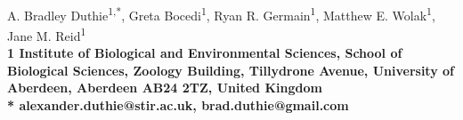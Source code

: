 \documentclass[10pt,letterpaper]{article}
\begin{document}
\vspace*{0.35in}

\begin{flushleft}
{\LARGE
\textbf{}
}
\newline
\\
A. Bradley Duthie\textsuperscript{1,*},
Greta Bocedi\textsuperscript{1},
Ryan R. Germain\textsuperscript{1},
Matthew E. Wolak\textsuperscript{1},
Jane M. Reid\textsuperscript{1}
\\
\bigskip
\bf{1} Institute of Biological and Environmental Sciences, School of Biological Sciences, Zoology Building, Tillydrone Avenue, University of Aberdeen, Aberdeen AB24 2TZ, United Kingdom
\\
\bigskip
*  alexander.duthie@stir.ac.uk, brad.duthie@gmail.com

\end{flushleft}
\end{document}
